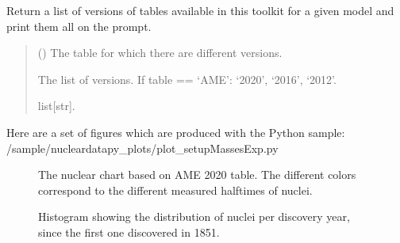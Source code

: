 \documentclass[letterpaper,10pt,english]{sphinxmanual}
\begin{document}
\begin{fulllineitems}
\label{\detokenize{source/api/setup_masses_exp:nucleardatapy.setup_masses_exp.versions_masses_exp}}
\pysigstartsignatures
\pysiglinewithargsret
{}
{}
{}
\pysigstopsignatures
\sphinxAtStartPar
Return a list of versions of tables available in
this toolkit for a given model and print them all on the prompt.
\begin{quote}\begin{description}
\sphinxAtStartPar
{} () \textendash{} The table for which there are different versions.

\sphinxAtStartPar
The list of versions.     If table == ‘AME’: ‘2020’, ‘2016’, ‘2012’.

\sphinxAtStartPar
list{[}str{]}.

\end{description}\end{quote}

\end{fulllineitems}


\sphinxAtStartPar
Here are a set of figures which are produced with the Python sample: /sample/nucleardatapy\_plots/plot\_setupMassesExp.py

\begin{figure}[htbp]
\centering
\capstart

\noindent{}
\caption{The nuclear chart based on AME 2020 table. The different colors correspond to the different measured half\sphinxhyphen{}times of nuclei.}\label{\detokenize{source/api/setup_masses_exp:id1}}\end{figure}

\begin{figure}[htbp]
\centering
\capstart

\noindent{}
\caption{Histogram showing the distribution of nuclei per discovery year, since the first one discovered in 1851.}\label{\detokenize{source/api/setup_masses_exp:id2}}\end{figure}

\sphinxstepscope
\end{document}
